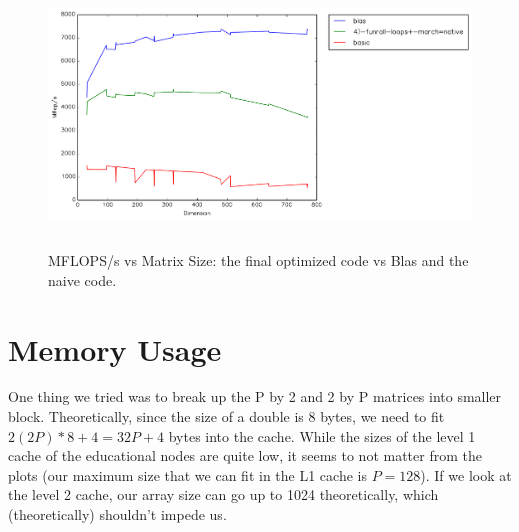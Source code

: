 \documentclass{article}
\begin{document}
    \begin{figure}[h]
    \centering
    \includegraphics[width=16cm,height=7cm]{timing-final-vs-blas.pdf}
    \caption{MFLOPS/s vs Matrix Size: the final optimized code vs Blas and the naive code.}
    \label{fig:final-vs-blas}
  \end{figure}

    \section{Memory Usage}

    One thing we tried was to break up the P by 2 and 2 by P matrices into smaller block. Theoretically, since the size of a double is 8 bytes, we need to fit
    $2(2P)*8 + 4 = 32P + 4$ bytes into the cache. While the sizes of the level 1 cache of the educational nodes are quite low, it seems to not matter from the plots (our maximum
    size that we can fit in the L1 cache is $P=128$). If we look at the level 2 cache, our array size can go up to 1024 theoretically, which (theoretically) shouldn't
    impede us.
\end{document}
